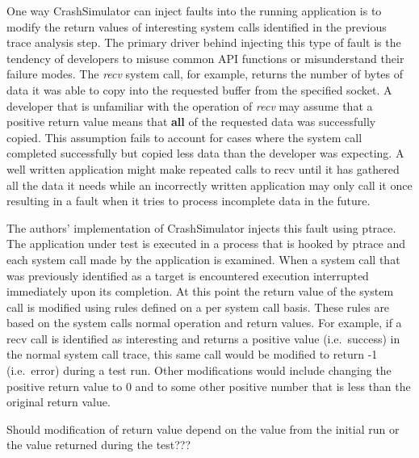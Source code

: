             One way CrashSimulator can inject faults into the running application is to modify the return values of
            interesting system calls identified in the previous trace analysis step. The primary driver behind injecting
            this type of fault is the tendency of developers to misuse common API functions or misunderstand their
            failure modes. The \emph{recv} system call, for example, returns the number of bytes of data it was able to
            copy into the requested buffer from the specified socket. A developer that is unfamiliar with the operation
            of \emph{recv} may assume that a positive return value means that \textbf{all} of the requested data was
            successfully copied. This assumption fails to account for cases where the system call completed successfully
            but copied less data than the developer was expecting. A well written application might make repeated calls
            to recv until it has gathered all the data it needs while an incorrectly written application may only call
            it once resulting in a fault when it tries to process incomplete data in the future.

            The authors' implementation of CrashSimulator injects this fault using ptrace. The application under test is
            executed in a process that is hooked by ptrace and each system call made by the application is examined.
            When a system call that was previously identified as a target is encountered execution interrupted
            immediately upon its completion. At this point the return value of the system call is modified using rules
            defined on a per system call basis. These rules are based on the system calls normal operation and return
            values. For example, if a recv call is identified as interesting and returns a positive value (i.e.\ success)
            in the normal system call trace, this same call would be modified to return -1 (i.e.\ error) during a test
            run. Other modifications would include changing the positive return value to 0 and to some other positive
            number that is less than the original return value.

            Should modification of return value depend on the value from the initial run or the value returned during
            the test???

